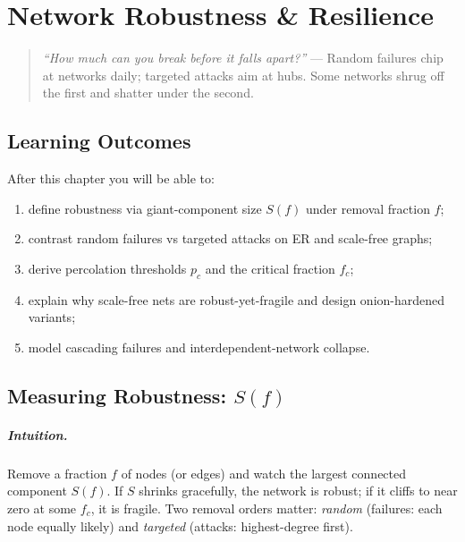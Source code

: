 \chapter{Network Robustness \& Resilience}
\label{ch:robustness}
\sloppy

\begin{quote}
\emph{``How much can you break before it falls apart?''} --- Random failures chip at networks daily; targeted attacks aim at hubs. Some networks shrug off the first and shatter under the second.
\end{quote}

\noindent{}
\vspace{0.4em}

\section*{Learning Outcomes}
After this chapter you will be able to:
\begin{enumerate}[label=(L\arabic*)]
    \item define robustness via giant-component size $S(f)$ under removal fraction $f$;
    \item contrast random failures vs targeted attacks on ER and scale-free graphs;
    \item derive percolation thresholds $p_c$ and the critical fraction $f_c$;
    \item explain why scale-free nets are robust-yet-fragile and design onion-hardened variants;
    \item model cascading failures and interdependent-network collapse.
\end{enumerate}

\section{Measuring Robustness: $S(f)$}
\label{sec:measure-robust}
\paragraph{Intuition.} Remove a fraction $f$ of nodes (or edges) and watch the largest connected component $S(f)$. If $S$ shrinks gracefully, the network is robust; if it cliffs to near zero at some $f_c$, it is fragile. Two removal orders matter: \emph{random} (failures: each node equally likely) and \emph{targeted} (attacks: highest-degree first).

